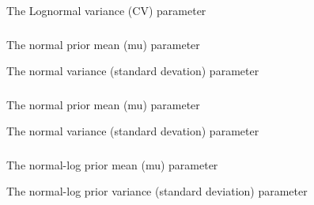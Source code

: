  {The Lognormal variance (CV) parameter}

\subsubsection[Normal]{}

 {The normal prior mean (mu) parameter}

 {The normal variance (standard devation) parameter}

\subsubsection[Normal By Stdev]{}

 {The normal prior mean (mu) parameter}

 {The normal variance (standard devation) parameter}

\subsubsection[Normal Log]{}

 {The normal-log prior mean (mu) parameter}

 {The normal-log prior variance (standard deviation) parameter}

\subsubsection[Uniform]{}

\subsubsection[Uniform Log]{}

